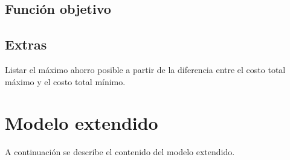 \documentclass{article}
\begin{document}
\subsection{Función objetivo}

\subsection{Extras}
Listar el máximo ahorro posible a partir de la diferencia entre el costo total máximo y el costo total mínimo.

\section{Modelo extendido}
A continuación se describe el contenido del modelo extendido. \newline
\end{document}
